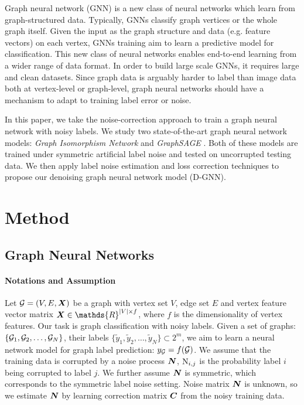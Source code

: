 \documentclass{article} %
\begin{document}
Graph neural network (GNN) is a new class of neural networks which learn from 
graph-structured data. Typically, GNNs classify graph vertices or the whole graph itself.
Given the input as the graph structure and data (e.g. feature vectors) on each 
vertex, GNNs training aim to learn a predictive model for classification. This new 
class of neural networks enables end-to-end learning from a wider range of data format.
In order to build large scale GNNs, it requires large and clean datasets. Since graph 
data is arguably harder to label than image data both at vertex-level or graph-level,
graph neural networks should have a mechanism to adapt to training label error or noise.

In this paper, we take the noise-correction approach to train a graph neural network with noisy 
labels. We study two state-of-the-art graph neural network models: \emph{Graph Isomorphism Network} \citep{xu2018how} 
and \emph{GraphSAGE} \citep{hamilton2017inductive}. Both of these models are trained under symmetric artificial label noise 
and tested on uncorrupted testing data. We then apply label noise estimation and loss 
correction techniques \citep{patrini2016loss,patrini2017making}
to propose our denoising graph neural network model (D-GNN).

\section{Method}

\subsection{Graph Neural Networks}

\paragraph{Notations and Assumption} Let ${\mathcal{G}} = (V,E,{\bm{X}})$ be a graph with vertex set $V$, edge 
set $E$ and vertex feature vector matrix $\mX \in \mathds{R}^{\vert V \vert \times f}$, where $f$ is the 
dimensionality of vertex features. Our task is graph classification with noisy labels. Given a set of graphs: 
$\{{\mathcal{G}}_1, {\mathcal{G}}_2, \ldots, {\mathcal{G}}_N\}$, their labels $\{\tilde{y}_1, \tilde{y}_2, \ldots, \tilde{y}_N\} \subset 2^m$,
we aim to learn a neural network model for graph label prediction: $y_{\mathcal{G}} = f({\mathcal{G}})$.
We assume that the training data is corrupted by a noise process ${\bm{N}}$, ${\textnormal{N}}_{i,j}$ is 
the probability label $i$ being corrupted to label $j$. We further assume ${\bm{N}}$ is symmetric, which 
corresponds to the symmetric label noise setting. Noise matrix ${\bm{N}}$ is unknown, so we estimate ${\bm{N}}$ 
by learning correction matrix ${\bm{C}}$ from the noisy training data.
\end{document}
